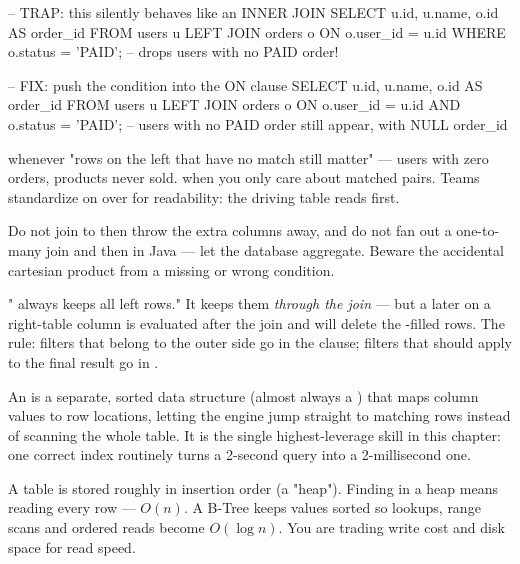 \begin{sqlbox}
-- TRAP: this silently behaves like an INNER JOIN
SELECT u.id, u.name, o.id AS order_id
FROM users u
LEFT JOIN orders o ON o.user_id = u.id
WHERE o.status = 'PAID';   -- drops users with no PAID order!

-- FIX: push the condition into the ON clause
SELECT u.id, u.name, o.id AS order_id
FROM users u
LEFT JOIN orders o ON o.user_id = u.id AND o.status = 'PAID';
-- users with no PAID order still appear, with NULL order_id
\end{sqlbox}

  whenever "rows on the left that have no match still matter" --- users with zero orders, products never sold.  when you only care about matched pairs. Teams standardize on  over  for readability: the driving table reads first.

 Do not join to then throw the extra columns away, and do not fan out a one-to-many join and then  in Java --- let the database aggregate. Beware the accidental cartesian product from a missing or wrong  condition.

\begin{misconception}
" always keeps all left rows." It keeps them \emph{through the join} --- but a later  on a right-table column is evaluated after the join and will delete the -filled rows. The rule: filters that belong to the outer side go in the  clause; filters that should apply to the final result go in .
\end{misconception}


 An  is a separate, sorted data structure (almost always a ) that maps column values to row locations, letting the engine jump straight to matching rows instead of scanning the whole table. It is the single highest-leverage skill in this chapter: one correct index routinely turns a 2-second query into a 2-millisecond one.

 A table is stored roughly in insertion order (a "heap"). Finding  in a heap means reading every row --- $O(n)$. A B-Tree keeps values sorted so lookups, range scans and ordered reads become $O(\log n)$. You are trading write cost and disk space for read speed.


